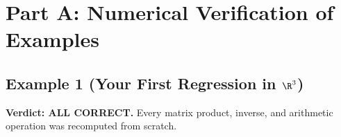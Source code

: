 %
%
%



\section*{Part A: Numerical Verification of Examples}


\subsection*{Example 1 (Your First Regression in $\R^3$)}

\textbf{Verdict: ALL CORRECT.}  Every matrix product, inverse, and
arithmetic operation was recomputed from scratch.


